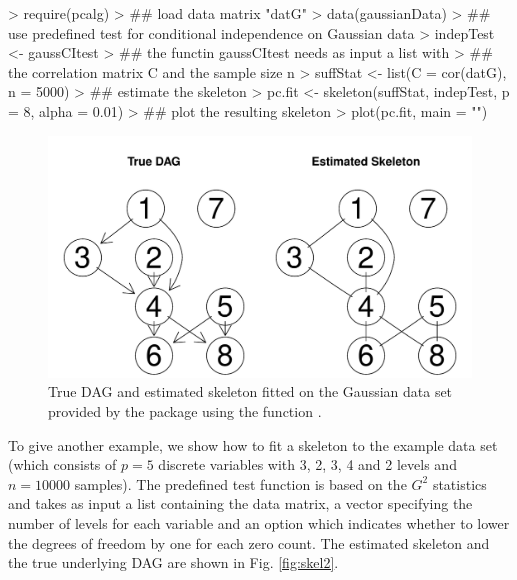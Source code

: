 \documentclass[article]{jss}
\begin{document}
\begin{Schunk}
\begin{Sinput}
> require(pcalg)
> ## load data matrix "datG"
> data(gaussianData)
> ## use predefined test for conditional independence on Gaussian data
> indepTest <- gaussCItest 
> ## the functin gaussCItest needs as input a list with
> ## the correlation matrix C and the sample size n
> suffStat <- list(C = cor(datG), n = 5000)
> ## estimate the skeleton
> pc.fit <- skeleton(suffStat, indepTest, p = 8, alpha = 0.01)
> ## plot the resulting skeleton
> plot(pc.fit, main = "")
\end{Sinput}
\end{Schunk}
\begin{figure}
  \begin{center}
\includegraphics{pcalgDoc-skelExpl1Plot}
\caption{True DAG and estimated skeleton fitted on the Gaussian data set
  provided by the package using the function .}
\label{fig:skelExpl}
\end{center}
\end{figure}

To give another example, we show how to fit a skeleton to the example data
set  (which consists of $p=5$ discrete variables with 3,
2, 3, 4 and 2 levels and $n=10000$ samples). The predefined test function
 is based on the $G^2$ statistics and takes as input a list
containing the data matrix, a vector specifying the number of levels for
each variable and an option which indicates whether to lower the degrees
of freedom by one for each zero count. The estimated
skeleton and the true underlying DAG are shown in Fig. \ref{fig:skel2}.
\end{document}
